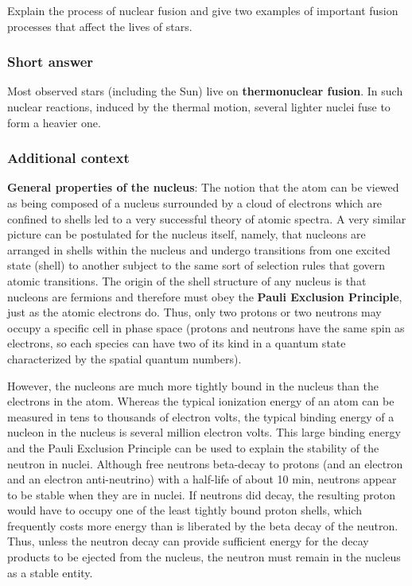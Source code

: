 \documentclass[a4paper,10pt]{article}
\begin{document}
Explain the process of nuclear fusion and give two examples of important fusion processes that affect the lives of stars.

\subsubsection{Short answer}

Most observed stars (including the Sun) live on \textbf{thermonuclear fusion}. In such nuclear reactions, induced by the thermal motion, several lighter nuclei fuse to form a heavier one.

\subsubsection{Additional context}

\textbf{General properties of the nucleus}: The notion that the atom can be viewed as being composed of a nucleus surrounded by a cloud of electrons which are confined to shells led to a very successful theory of atomic spectra. A very similar picture can be postulated for the nucleus itself, namely, that nucleons are arranged in shells within the nucleus and undergo transitions from one excited state (shell) to another subject to the same sort of selection rules that govern atomic transitions. The origin of the shell structure of any nucleus is that nucleons are fermions and therefore must obey the \textbf{Pauli Exclusion Principle}, just as the atomic electrons do. Thus, only two protons or two neutrons may occupy a specific cell in phase space (protons and neutrons have the same spin as electrons, so each species can have two of its kind in a quantum state characterized by the spatial quantum numbers).

{\noindent}However, the nucleons are much more tightly bound in the nucleus than the electrons in the atom. Whereas the typical ionization energy of an atom can be measured in tens to thousands of electron volts, the typical binding energy of a nucleon in the nucleus is several million electron volts. This large binding energy and the Pauli Exclusion Principle can be used to explain the stability of the neutron in nuclei. Although free neutrons beta-decay to protons (and an electron and an electron anti-neutrino) with a half-life of about 10 min, neutrons appear to be stable when they are in nuclei. If neutrons did decay, the resulting proton would have to occupy one of the least tightly bound proton shells, which frequently costs more energy than is liberated by the beta decay of the neutron. Thus, unless the neutron decay can provide sufficient energy for the decay products to be ejected from the nucleus, the neutron must remain in the nucleus as a stable entity.
\end{document}
